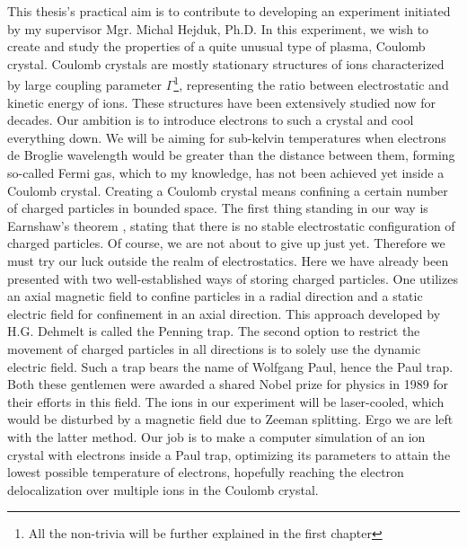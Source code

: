 
This thesis's practical aim is to contribute to developing an experiment initiated by my supervisor Mgr. Michal Hejduk, Ph.D. In this experiment, we wish to create and study the properties of a quite unusual type of plasma, Coulomb crystal. Coulomb crystals are mostly stationary structures of ions characterized by large coupling parameter $\Gamma$\footnote{All the non-trivia will be further explained in the first chapter}, representing the ratio between electrostatic and kinetic energy of ions. These structures have been extensively studied now for decades. Our ambition is to introduce electrons to such a crystal and cool everything down. We will be aiming for sub-kelvin temperatures when electrons de Broglie wavelength would be greater than the distance between them, forming so-called Fermi gas, which to my knowledge, has not been achieved yet inside a Coulomb crystal. Creating a Coulomb crystal means confining a certain number of charged particles in bounded space. The first thing standing in our way is Earnshaw's theorem \cite{earnshaw1848nature}, stating that there is no stable electrostatic configuration of charged particles. Of course, we are not about to give up just yet. Therefore we must try our luck outside the realm of electrostatics. Here we have already been presented with two well-established ways of storing charged particles. One utilizes an axial magnetic field to confine particles in a radial direction and a static electric field for confinement in an axial direction. This approach developed by H.G. Dehmelt is called the Penning trap. The second option to restrict the movement of charged particles in all directions is to solely use the dynamic electric field. Such a trap bears the name of Wolfgang Paul, hence the Paul trap. Both these gentlemen were awarded a shared Nobel prize for physics in 1989 for their efforts in this field. The ions in our experiment will be laser-cooled, which would be disturbed by a magnetic field due to Zeeman splitting. Ergo we are left with the latter method. Our job is to make a computer simulation of an ion crystal with electrons inside a Paul trap, optimizing its parameters to attain the lowest possible temperature of electrons, hopefully reaching the electron delocalization over multiple ions in the Coulomb crystal.

